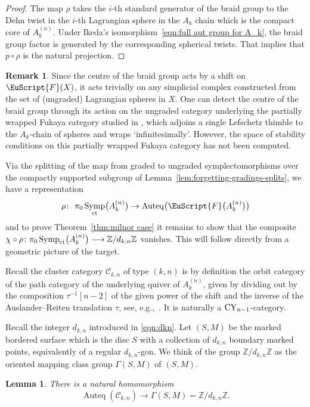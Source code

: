 \documentclass[10pt,a4paper]{amsart}
\DeclareMathOperator{\Auteq}{Auteq}
\newcommand{\scrF}{\EuScript{F}}
\DeclareMathOperator{\Symp}{Symp}
\def\bZ{\mathbb{Z}}
\newtheorem{lem}[thm]{Lemma}
\theoremstyle{definition}
\newtheorem{rmk}[thm]{Remark}
\numberwithin{equation}{section}
\begin{document}
\begin{proof}
The map $\rho$ takes the $i$-th standard generator of the braid group to the Dehn twist in the $i$-th Lagrangian sphere in the $A_k$ chain which is the compact core of $A_k^{(n)}$. Under Ikeda's isomorphism~\eqref{eqn:full aut group for A_k}, the braid group factor is generated by the corresponding spherical twists. That implies that $p \circ \rho$ is the natural projection.
\end{proof}

\begin{rmk}
Since the centre of the braid group acts by a shift on $\scrF(X)$, it acts trivially on any simplicial complex constructed from the set of (ungraded) Lagrangian spheres in $X$. One can detect the centre of the braid group through its action on the ungraded category underlying the partially wrapped Fukaya category studied in \cite[Section~20]{Seidel:FCPLT}, which adjoins a single Lefschetz thimble to the $A_k$-chain of spheres and wraps `infinitesimally'. However, the space of stability conditions on this partially wrapped Fukaya category has not been computed.
\end{rmk}

Via the splitting of the map from graded to ungraded symplectomorphisms over the compactly supported subgroup of Lemma~\ref{lem:forgetting-gradings-splits}, we have a representation
\[
\rho\colon \ \pi_0\Symp_{\rm ct}\bigl(A_k^{(n)}\bigr) \to \Auteq\bigl(\scrF\bigl(A_k^{(n)}\bigr)\bigr)
\]
and to prove Theorem~\ref{thm:milnor case} it remains to show that the composite $\chi \circ \rho\colon \pi_0\Symp_{\rm ct}\bigl(A_k^{(n)}\bigr) \longrightarrow \bZ/d_{k,n}\bZ$ vanishes. This will follow directly from a geometric picture of the target.

 Recall the cluster category $\mathcal{C}_{k,n}$ of type $(k,n)$ is by definition the orbit category of the path category of the underlying quiver of $A_k^{(n)}$, given by dividing out by the composition $\tau^{-1}[n-2]$ of the given power of the shift and the inverse of the Auslander--Reiten translation $\tau$, see, e.g.,~\cite{Baur-Marsh}. It is naturally a ${\rm CY}_{n-1}$-category.

 Recall the integer $d_{k,n}$ introduced in \eqref{eqn:dkn}.
 Let $(S,M)$ be the marked bordered surface which is the disc $S$ with a collection of $d_{k,n}$ boundary marked points, equivalently of a regular $d_{k,n}$-gon.
 We think of the group $\bZ/d_{k,n}\bZ$ as the oriented mapping class group $\Gamma(S, M)$ of $(S,M)$.

 \begin{lem}
 There is a natural homomorphism
 \[
\Auteq(\mathcal{C}_{k,n}) \longrightarrow \Gamma(S,M) = \bZ/d_{k,n}\bZ.
\]
 \end{lem}
\end{document}
